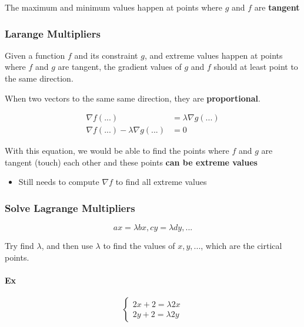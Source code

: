     The maximum and minimum values happen at points where $ g $ and $ f $
    are \textbf{tangent}

    \subsubsection{Larange Multipliers}

      Given a function $ f $ and its constraint $ g $, and extreme values
      happen at points where $ f $ and $ g $ are tangent, the gradient values
      of $ g $ and $ f $ should at least point to the same direction.

      When two vectors to the same same direction, they are
      \textbf{proportional}.

      \begin{align}
        \nabla f\left( ... \right) &= \lambda \nabla g\left( ... \right) \\
        \nabla f\left( ... \right) - \lambda \nabla g\left( ... \right) &= 0
      \end{align}

      With this equation, we would be able to find the points where $ f $
      and $ g $ are tangent (touch) each other and these points
      \textbf{can be extreme values}

      \begin{itemize}
        \item Still needs to compute $ \nabla f $ to find all extreme values
      \end{itemize}

    \subsubsection{Solve Lagrange Multipliers}

      \begin{displaymath}
        ax = \lambda bx, cy = \lambda dy, ...
      \end{displaymath}

      Try find $ \lambda $, and then use $ \lambda $ to find the values
      of $ x, y, ... $, which are the cirtical points.

      \paragraph{Ex}
      \begin{displaymath}
        \begin{cases}
          2x + 2 = \lambda 2 x \\
          2y + 2 = \lambda 2 y
        \end{cases}
      \end{displaymath}

